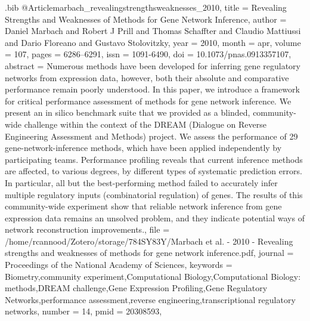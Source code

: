 \documentclass[
  table,
  10pt,
  a4paper]{article}
\begin{document}
\begin{filecontents}{\jobname.bib}
@Article{marbach_revealingstrengthsweaknesses_2010,
	title = {Revealing Strengths and Weaknesses of Methods for Gene Network Inference},
	author = {Daniel Marbach and Robert J Prill and Thomas Schaffter and Claudio Mattiussi and Dario Floreano and Gustavo Stolovitzky},
	year = {2010},
	month = {apr},
	volume = {107},
	pages = {6286--6291},
	issn = {1091-6490},
	doi = {10.1073/pnas.0913357107},
	abstract = {Numerous methods have been developed for inferring gene regulatory networks from expression data, however, both their absolute and comparative performance remain poorly understood. In this paper, we introduce a framework for critical performance assessment of methods for gene network inference. We present an in silico benchmark suite that we provided as a blinded, community-wide challenge within the context of the DREAM (Dialogue on Reverse Engineering Assessment and Methods) project. We assess the performance of 29 gene-network-inference methods, which have been applied independently by participating teams. Performance profiling reveals that current inference methods are affected, to various degrees, by different types of systematic prediction errors. In particular, all but the best-performing method failed to accurately infer multiple regulatory inputs (combinatorial regulation) of genes. The results of this community-wide experiment show that reliable network inference from gene expression data remains an unsolved problem, and they indicate potential ways of network reconstruction improvements.},
	file = {/home/rcannood/Zotero/storage/784SY83Y/Marbach et al. - 2010 - Revealing strengths and weaknesses of methods for gene network inference.pdf},
	journal = {Proceedings of the National Academy of Sciences},
	keywords = {Biometry,community experiment,Computational Biology,Computational Biology: methods,DREAM challenge,Gene Expression Profiling,Gene Regulatory Networks,performance assessment,reverse engineering,transcriptional regulatory networks},
	number = {14},
	pmid = {20308593},
}


\end{filecontents}
\end{document}
